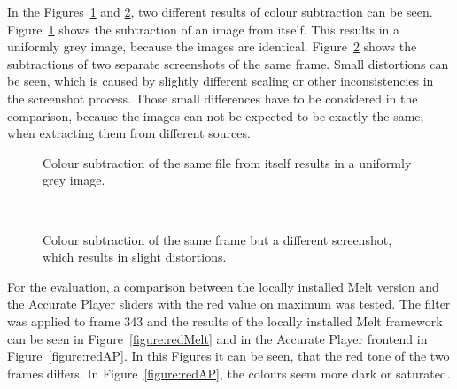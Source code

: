 \documentclass[../MasterThesis.tex]{subfiles}
\begin{document}
In the Figures~\ref{figure:greyresult_unit} and \ref{figure:greyresult_blurry}, two different results of colour subtraction can be seen. Figure~\ref{figure:greyresult_unit} shows the subtraction of an image from itself. This results in a uniformly grey image, because the images are identical. Figure~\ref{figure:greyresult_blurry} shows the subtractions of two separate screenshots of the same frame. Small distortions can be seen, which is caused by slightly different scaling or other inconsistencies in the screenshot process. Those small differences have to be considered in the comparison, because the images can not be expected to be exactly the same, when extracting them from different sources.


\begin{minipage}{0.48\textwidth}
	
	\begin{figure}[H]
		\begin{center}
			\caption[Colour subtraction of the same file from itself.]{Colour subtraction of the same file from itself results in a uniformly grey image.}
			\label{figure:greyresult_unit}
		\end{center}
	\end{figure}
\end{minipage}\begin{minipage}{0.04\textwidth}
	\ 
\end{minipage}\begin{minipage}{0.48\textwidth}	
	\begin{figure}[H]
		\begin{center}
			\caption[Colour subtraction of the same frame but a different screenshot.]{Colour subtraction of the same frame but a different screenshot, which results in slight distortions.}
			\label{figure:greyresult_blurry}
		\end{center}
	\end{figure}
\end{minipage}

\vspace*{2em}
For the evaluation, a comparison between the locally installed Melt version and the Accurate Player sliders with the red value on maximum was tested. The filter was applied to frame 343 and the results of the locally installed Melt framework can be seen in Figure~\ref{figure:redMelt} and in the Accurate Player frontend in Figure~\ref{figure:redAP}. In this Figures it can be seen, that the red tone of the two frames differs. In Figure~\ref{figure:redAP}, the colours seem more dark or saturated.
\end{document}
